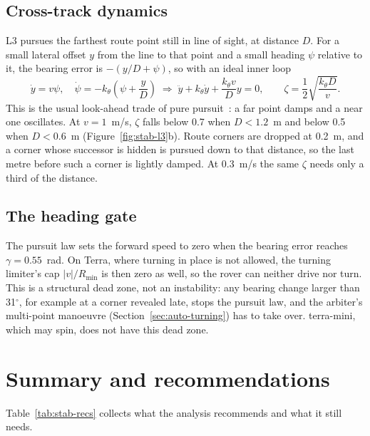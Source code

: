 \subsection{Cross-track dynamics}

L3 pursues the farthest route point still in line of sight, at distance $D$.
For a small lateral offset $y$ from the line to that point and a small heading $\psi$ relative to it, the bearing error is $-(y/D + \psi)$, so with an ideal inner loop
\begin{equation}
  \dot y = v\psi, \quad \dot\psi = -k_\theta\left(\psi + \frac{y}{D}\right)
  \;\Rightarrow\;
  \ddot y + k_\theta \dot y + \frac{k_\theta v}{D} y = 0, \qquad
  \zeta = \frac12\sqrt{\frac{k_\theta D}{v}}.
  \label{eq:stab-zeta}
\end{equation}
This is the usual look-ahead trade of pure pursuit~\citep{coulter1992pursuit}: a far point damps and a near one oscillates.
At $v = 1$~m/s, $\zeta$ falls below 0.7 when $D < 1.2$~m and below 0.5 when $D < 0.6$~m (Figure~\ref{fig:stab-l3}b).
Route corners are dropped at 0.2~m, and a corner whose successor is hidden is pursued down to that distance, so the last metre before such a corner is lightly damped.
At 0.3~m/s the same $\zeta$ needs only a third of the distance.

\subsection{The heading gate}

The pursuit law sets the forward speed to zero when the bearing error reaches $\gamma = 0.55$~rad.
On Terra, where turning in place is not allowed, the turning limiter's cap $|v|/R_{\min}$ is then zero as well, so the rover can neither drive nor turn.
This is a structural dead zone, not an instability: any bearing change larger than 31$^\circ$, for example at a corner revealed late, stops the pursuit law, and the arbiter's multi-point manoeuvre (Section~\ref{sec:auto-turning}) has to take over.
terra-mini, which may spin, does not have this dead zone.

\section{Summary and recommendations}
\label{sec:stab-summary}

Table~\ref{tab:stab-recs} collects what the analysis recommends and what it still needs.

